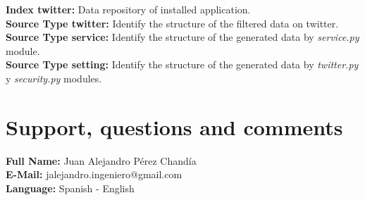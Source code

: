 \documentclass[report]{article}
\begin{document}
\textbf{Index twitter: }Data repository of installed application.\\
\textbf{Source Type twitter: }Identify the structure of the filtered data on twitter.\\
\textbf{Source Type service: }Identify the structure of the generated data by \textit{service.py} module.\\
\textbf{Source Type setting: }Identify the structure of the generated data by \textit{twitter.py} y \textit{security.py} modules.
\newline
\section{Support, questions and comments}

\textbf{Full Name: }Juan Alejandro P\'erez Chand\'ia\\
\textbf{E-Mail: }jalejandro.ingeniero@gmail.com\\
\textbf{Language: }Spanish - English
\end{document}
